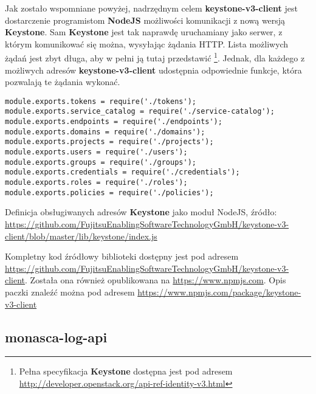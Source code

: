 Jak zostało wspomniane powyżej, nadrzędnym celem \textbf{keystone-v3-client} jest dostarczenie programistom \textbf{NodeJS} możliwości
komunikacji z nową wersją \textbf{Keystone}. Sam \textbf{Keystone} jest tak naprawdę uruchamiany jako serwer, z którym komunikować się można,
wysyłając żądania HTTP. Lista możliwych żądań jest zbyt długa, aby w pełni ją tutaj przedstawić 
\footnote{Pełna specyfikacja \textbf{Keystone} dostępna jest pod adresem \url{http://developer.openstack.org/api-ref-identity-v3.html}}. Jednak,
dla każdego z możliwych adresów \textbf{keystone-v3-client} udostępnia odpowiednie funkcje, która pozwalają te żądania wykonać.
    \begin{listing}
        \begin{verbatim}
module.exports.tokens = require('./tokens');
module.exports.service_catalog = require('./service-catalog');
module.exports.endpoints = require('./endpoints');
module.exports.domains = require('./domains');
module.exports.projects = require('./projects');
module.exports.users = require('./users');
module.exports.groups = require('./groups');
module.exports.credentials = require('./credentials');
module.exports.roles = require('./roles');
module.exports.policies = require('./policies');
        \end{verbatim}
        \label{chapter:application:own_work:keystone_v3_client:endpoints}
        \caption[Definicja obsługiwanych adresów \textbf{Keystone}]{
            Definicja obsługiwanych adresów \textbf{Keystone} jako moduł NodeJS, źródło: \url{https://github.com/FujitsuEnablingSoftwareTechnologyGmbH/keystone-v3-client/blob/master/lib/keystone/index.js}}
    \end{listing}

Kompletny kod źródłowy biblioteki dostępny jest pod adresem \url{https://github.com/FujitsuEnablingSoftwareTechnologyGmbH/keystone-v3-client}.
Została ona również opublikowana na \url{https://www.npmjs.com}. 
Opis paczki znaleźć można pod adresem \url{https://www.npmjs.com/package/keystone-v3-client}

\subsection{monasca-log-api}

